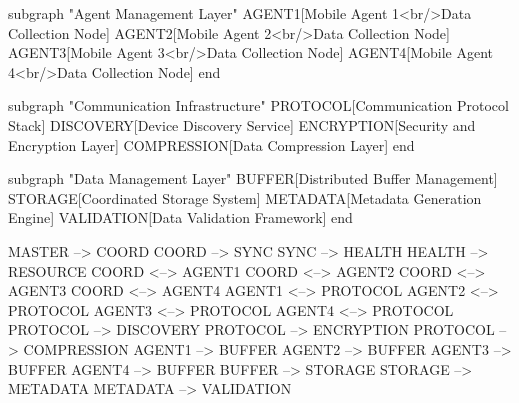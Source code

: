 \documentclass[12pt,a4paper]{report}
\begin{document}
    subgraph "Agent Management Layer"
        AGENT1[Mobile Agent 1<br/>Data Collection Node]
        AGENT2[Mobile Agent 2<br/>Data Collection Node]
        AGENT3[Mobile Agent 3<br/>Data Collection Node]
        AGENT4[Mobile Agent 4<br/>Data Collection Node]
    end

    subgraph "Communication Infrastructure"
        PROTOCOL[Communication Protocol Stack]
        DISCOVERY[Device Discovery Service]
        ENCRYPTION[Security and Encryption Layer]
        COMPRESSION[Data Compression Layer]
    end

    subgraph "Data Management Layer"
        BUFFER[Distributed Buffer Management]
        STORAGE[Coordinated Storage System]
        METADATA[Metadata Generation Engine]
        VALIDATION[Data Validation Framework]
    end

    MASTER --> COORD
    COORD --> SYNC
    SYNC --> HEALTH
    HEALTH --> RESOURCE
    COORD <--> AGENT1
    COORD <--> AGENT2
    COORD <--> AGENT3
    COORD <--> AGENT4
    AGENT1 <--> PROTOCOL
    AGENT2 <--> PROTOCOL
    AGENT3 <--> PROTOCOL
    AGENT4 <--> PROTOCOL
    PROTOCOL --> DISCOVERY
    PROTOCOL --> ENCRYPTION
    PROTOCOL --> COMPRESSION
    AGENT1 --> BUFFER
    AGENT2 --> BUFFER
    AGENT3 --> BUFFER
    AGENT4 --> BUFFER
    BUFFER --> STORAGE
    STORAGE --> METADATA
    METADATA --> VALIDATION
\end{document}
